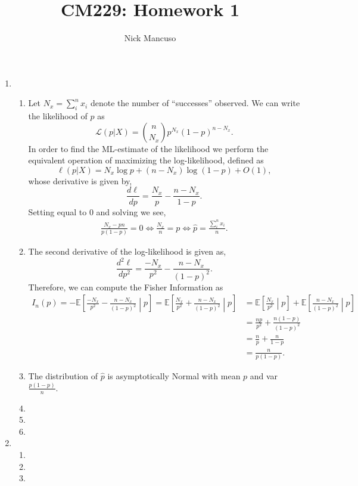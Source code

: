 \documentclass[10pt]{article}
\def\E{\mathbb{E}}
\begin{document}
\title{CM229: Homework 1}
\author{Nick Mancuso}
\maketitle

\begin{enumerate}
\item
\begin{enumerate}
\item
Let $N_x = \sum_i^n x_i$ denote the number of ``successes'' observed. We can write the
likelihood of $p$ as \[ \mathcal{L}(p| X) = {n \choose N_x} p^{N_x} (1 - p)^{n - N_x}.\] In order
to find the ML-estimate of the likelihood we perform the equivalent operation of maximizing the
log-likelihood, defined as \[\ell(p | X) = N_x \log p + (n - N_x) \log (1 - p) + O(1),\] whose
derivative is given by, \[ \frac{d \ell}{d p} = \frac{N_x}{p} - \frac{n - N_x}{1 - p}.\] Setting
equal to 0 and solving we see,
\begin{align*}
    \frac{N_x - pn}{p(1 - p)} = 0 \Leftrightarrow 
    \frac{N_x}{n} = p \Leftrightarrow 
    \hat{p} = \frac{\sum_i^n x_i}{n}.
\end{align*}

\item
The second derivative of the log-likelihood is given as, 
\[ \frac{d^2 \ell}{d p^2} = \frac{-N_x}{p^2} - \frac{n - N_x}{(1 - p)^2}.\] Therefore, we can
compute the Fisher Information as
\begin{align*}
    I_n(p) = -\E\left[\frac{-N_x}{p^2} - \frac{n - N_x}{(1 - p)^2} \middle\rvert p \right] = 
    \E\left[\frac{N_x}{p^2} + \frac{n - N_x}{(1 - p)^2} \middle\rvert p \right]
    &= \E\left[\frac{N_x}{p^2} \middle\rvert p\right] + \E\left[\frac{n - N_x}{(1 - p)^2} \middle\rvert p \right] \\
    &= \frac{n p}{p^2} + \frac{n (1 - p)}{(1 - p)^2}\\
    &= \frac{n}{p} + \frac{n}{1 - p} \\
    &= \frac{n}{p(1 - p)}.
\end{align*}
\item
The distribution of $\hat{p}$ is asymptotically Normal with mean $p$ and var $\frac{p(1 - p)}{n}$.
\item
\item
\item
\end{enumerate}

\item
\begin{enumerate}
\item
\item
\item
\end{enumerate}


\end{enumerate}
\end{document}
